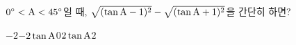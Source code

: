 $0^\circ<\mathrm{A}<45^\circ$일 때, $\sqrt{(\tan\mathrm{A}-1)^2}-\sqrt{(\tan\mathrm{A}+1)^2}$을 간단히 하면?
\begin{choices32}{$-2$}{$-2\tan\mathrm{A}$}{$0$}{$2\tan\mathrm{A}$}{$2$}\end{choices32}
